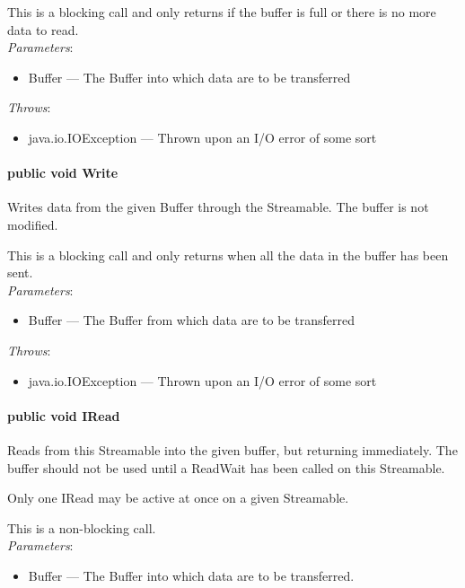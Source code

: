 \documentclass[$Date: 2003/06/26 19:29:31 $]{glabarticle}
\begin{document}
This is a blocking call and only returns if the buffer is full
or there is no more data to read.\\
 
\textit{Parameters}:
\begin{itemize}
\item[] Buffer --- The Buffer into which data are to be transferred 
\end{itemize}

 \textit{Throws}:
 \begin{itemize}
 \item[] java.io.IOException --- Thrown upon an I/O error of some sort 
 \end{itemize}

\paragraph{public void Write}

Writes data from the given Buffer through the Streamable.  The buffer is not
modified.
 
This is a blocking call and only returns when all the data in the
buffer has been sent.\\

\textit{Parameters}:
\begin{itemize}
\item[] Buffer --- The Buffer from which data are to be transferred 
\end{itemize}

 \textit{Throws}:
 \begin{itemize}
 \item[] java.io.IOException --- Thrown upon an I/O error of some sort 
 \end{itemize}

\paragraph{public void IRead}

Reads from this Streamable into the given buffer, but returning
immediately.  The buffer should not be used until a ReadWait has
been called on this Streamable.

Only one IRead may be active at once on a given Streamable.

This is a non-blocking call.\\
 
\textit{Parameters}:
\begin{itemize}
\item[] Buffer --- The Buffer into which data are to be transferred. 
\end{itemize}
\end{document}
